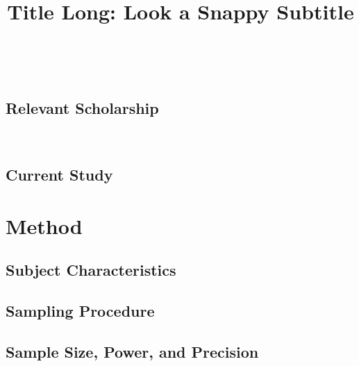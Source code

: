 \documentclass[a4paper,man,apacite,natbib,12pt]{apa6}\usepackage[]{graphicx}\usepackage[]{color}
\title{Title Long: Look a Snappy Subtitle}
\begin{document}
\maketitle




\\


\subsection{Relevant Scholarship}
\\

\subsection{Current Study}


\section{Method}


\subsection{Subject Characteristics}


\subsection{Sampling Procedure}


\subsection{Sample Size, Power, and Precision}

\end{document}
